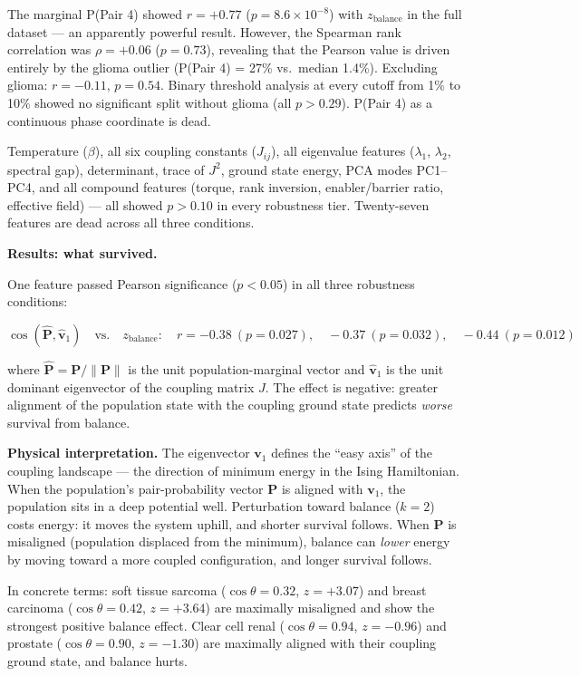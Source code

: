 \documentclass[
  11pt,
]{article}
\begin{document}
The marginal P(Pair 4) showed \(r = +0.77\) (\(p = 8.6 \times 10^{-8}\))
with \(z_\mathrm{balance}\) in the full dataset --- an apparently
powerful result. However, the Spearman rank correlation was
\(\rho = +0.06\) (\(p = 0.73\)), revealing that the Pearson value is
driven entirely by the glioma outlier (P(Pair 4) = 27\% vs.~median
1.4\%). Excluding glioma: \(r = -0.11\), \(p = 0.54\). Binary threshold
analysis at every cutoff from 1\% to 10\% showed no significant split
without glioma (all \(p > 0.29\)). P(Pair 4) as a continuous phase
coordinate is dead.

Temperature (\(\beta\)), all six coupling constants (\(J_{ij}\)), all
eigenvalue features (\(\lambda_1\), \(\lambda_2\), spectral gap),
determinant, trace of \(J^2\), ground state energy, PCA modes PC1--PC4,
and all compound features (torque, rank inversion, enabler/barrier
ratio, effective field) --- all showed \(p > 0.10\) in every robustness
tier. Twenty-seven features are dead across all three conditions.

\textbf{Results: what survived.}

One feature passed Pearson significance (\(p < 0.05\)) in all three
robustness conditions:

\[\cos(\hat{\mathbf{P}}, \hat{\mathbf{v}}_1) \quad \text{vs.} \quad z_\mathrm{balance}: \quad r = -0.38\ (p = 0.027), \quad -0.37\ (p = 0.032), \quad -0.44\ (p = 0.012) \tag{6}\]

where \(\hat{\mathbf{P}} = \mathbf{P}/\|\mathbf{P}\|\) is the unit
population-marginal vector and \(\hat{\mathbf{v}}_1\) is the unit
dominant eigenvector of the coupling matrix \(J\). The effect is
negative: greater alignment of the population state with the coupling
ground state predicts \emph{worse} survival from balance.

\textbf{Physical interpretation.} The eigenvector \(\mathbf{v}_1\)
defines the ``easy axis'' of the coupling landscape --- the direction of
minimum energy in the Ising Hamiltonian. When the population's
pair-probability vector \(\mathbf{P}\) is aligned with \(\mathbf{v}_1\),
the population sits in a deep potential well. Perturbation toward
balance (\(k = 2\)) costs energy: it moves the system uphill, and
shorter survival follows. When \(\mathbf{P}\) is misaligned (population
displaced from the minimum), balance can \emph{lower} energy by moving
toward a more coupled configuration, and longer survival follows.

In concrete terms: soft tissue sarcoma (\(\cos\theta = 0.32\),
\(z = +3.07\)) and breast carcinoma (\(\cos\theta = 0.42\),
\(z = +3.64\)) are maximally misaligned and show the strongest positive
balance effect. Clear cell renal (\(\cos\theta = 0.94\), \(z = -0.96\))
and prostate (\(\cos\theta = 0.90\), \(z = -1.30\)) are maximally
aligned with their coupling ground state, and balance hurts.
\end{document}
